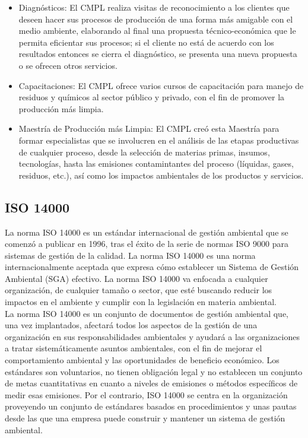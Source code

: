 	\begin{itemize}
		\item Diagnósticos: El CMPL realiza visitas de reconocimiento a los clientes que deseen hacer sus procesos de producción de una forma más amigable con el medio ambiente, elaborando al final una propuesta técnico-económica que le permita eficientar sus procesos; si el cliente no está de acuerdo con los resultados entonces se cierra el diagnóstico, se presenta una nueva propuesta o se ofrecen otros servicios.
		\item Capacitaciones: El CMPL ofrece varios cursos de capacitación para manejo de residuos y químicos al sector público y privado, con el fin de promover la producción más limpia.
		\item Maestría de Producción más Limpia: El CMPL creó esta Maestría para formar especialistas que se involucren en el análisis de las etapas productivas de cualquier proceso, desde la selección de materias primas, insumos, tecnologías, hasta las emisiones contamintantes del proceso (líquidas, gases, residuos, etc.), así como los impactos ambientales de los productos y servicios. \cite{CMPLWebPage}
	\end{itemize}
	
	\subsection{ISO 14000}
	La norma ISO 14000 es un estándar internacional de gestión ambiental que se comenzó a publicar en 1996, tras el éxito de la serie de normas ISO 9000 para sistemas de gestión de la calidad. La norma ISO 14000 es una norma internacionalmente aceptada que expresa cómo establecer un Sistema de Gestión Ambiental (SGA) efectivo. La norma ISO 14000 va enfocada a cualquier organización, de cualquier tamaño o sector, que esté buscando reducir los impactos en el ambiente y cumplir con la legislación en materia ambiental.\\
	
	La norma ISO 14000 es un conjunto de documentos de gestión ambiental que, una vez implantados, afectará todos los aspectos de la gestión de una organización en sus responsabilidades ambientales y ayudará a las organizaciones a tratar sistemáticamente asuntos ambientales, con el fin de mejorar el comportamiento ambiental y las oportunidades de beneficio económico. Los estándares son voluntarios, no tienen obligación legal y no establecen un conjunto de metas cuantitativas en cuanto a niveles de emisiones o métodos específicos de medir esas emisiones. Por el contrario, ISO 14000 se centra en la organización proveyendo un conjunto de estándares basados en procedimientos y unas pautas desde las que una empresa puede construir y mantener un sistema de gestión ambiental. \cite{ISO14000}\\
	

